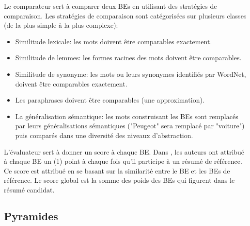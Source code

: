 \documentclass[a4paper,12pt,oneside]{../use/ESIthesis}
\begin{document}
Le comparateur sert à comparer deux BEs en utilisant des stratégies de comparaison. 
Les stratégies de comparaison sont catégorisées sur plusieurs classes (de la plus simple à la plus complexe):
\begin{itemize}
\item Similitude lexicale: les mots doivent être comparables exactement.
\item Similitude de lemmes: les formes racines des mots doivent être comparables.
\item Similitude de synonyme: les mots ou leurs synonymes identifiés par WordNet, doivent être comparables exactement.
\item Les paraphrases doivent être comparables (une approximation).
\item La généralisation sémantique: les mots construisant les BEs sont remplacés par leurs généralisations sémantiques ("Peugeot" sera remplacé par "voiture") puis comparés dans une diversité des niveaux d'abstraction.
\end{itemize}

L'évaluateur sert à donner un score à chaque BE. 
Dans \cite{06-hovy-al}, les auteurs ont attribué à chaque BE un (1) point à chaque fois qu'il participe à un résumé de référence. 
Ce score est attribué en se basant sur la similarité entre le BE et les BEs de référence.
Le score global est la somme des poids des BEs qui figurent dans le résumé candidat.

\subsection{Pyramides}
\end{document}
